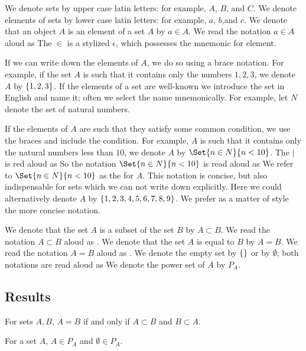 We denote sets by upper case latin letters: for example, $A$, $B$, and $C$.
We denote elements of sets by lower case latin letters: for example, $a$, $b$,and $c$.
We denote that an object $A$ is an element of a set $A$ by $a \in A$.
We read the notation $a \in A$ aloud as 
The $\in$ is a stylized $\epsilon$, which possesses the mnemonic for element.

If we can write down the elements of $A$, we do so using a brace notation.
For example, if the set $A$ is such that it contains only the numbers $1, 2, 3$, we denote $A$ by $\{1, 2, 3\}$.
If the elements of a set are well-known we introduce the set in English and name it; often we select the name mnemonically.
For example, let $N$ denote the set of natural numbers.

If the elements of $A$ are such that they satisfy some common condition, we use the braces and include the condition.
For example, $A$ is such that it contains only the natural numbers less than $10$, we denote $A$ by $\Set{n \in N}{n < 10}$.
The $|$ is red aloud as 
So the notation $\Set{n \in N}{n < 10}$ is read aloud as 
We refer to $\Set{n \in N}{n < 10}$ as the  for $A$.
This notation is concise, but also indispensable for sets which we can not write down explicitly.
Here we could alternatively denote $A$ by $\{1, 2, 3, 4, 5, 6, 7, 8, 9\}$.
We prefer as a matter of style the more concise notation.

We denote that the set $A$ is a subset of the set $B$ by $A \subset B$.
We read the notation $A \subset B$ aloud as .
We denote that the set $A$ is equal to $B$ by $A = B$.
We read the notation $A = B$ aloud as .
We denote the empty set by $\{\}$ or by $\emptyset$; both notations are read aloud as 
We denote the power set of $A$ by $P_A$.


\subsection{Results}

\begin{prop}
  For sets $A, B$, $A = B$ if and only if $A \subset B$ and $B \subset A$.
\end{prop}

\begin{prop}
  For a set $A$, $A \in P_A$ and $\emptyset \in P_A$.
\end{prop}

